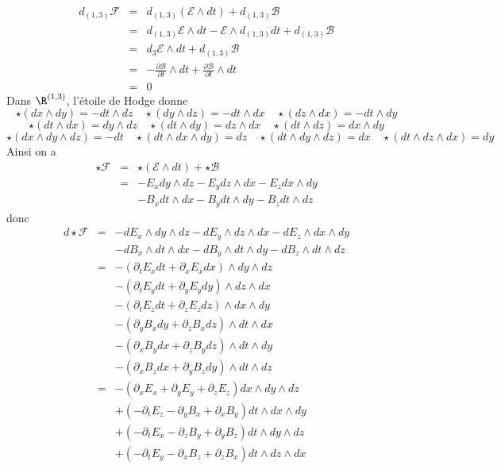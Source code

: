 \begin{eqnarray*}
d_{(1,3)}\mathscr{F} &=& d_{(1,3)}(\mathscr{E}\wedge dt) + d_{(1,3)}\mathscr{B} \\
&=& d_{(1,3)}\mathscr{E} \wedge dt - \mathscr{E} \wedge d_{(1,3)}dt + d_{(1,3)}\mathscr{B} \\
&=& d_3\mathscr{E} \wedge dt + d_{(1,3)}\mathscr{B} \\
&=& -\frac{\partial \mathscr{B}}{\partial t}\wedge dt + \frac{\partial \mathscr{B}}{\partial t}\wedge dt \\
&=& 0
\end{eqnarray*}
Dans $\R^{(1, 3)}$, l'étoile de Hodge donne 
$$\star(dx\wedge dy) = - dt\wedge dz \quad \star(dy\wedge dz) = - dt\wedge dx \quad \star(dz\wedge dx) = - dt\wedge dy$$
$$\star(dt\wedge dx) = dy\wedge dz \quad \star(dt\wedge dy) =  dz\wedge dx \quad \star(dt\wedge dz) = dx\wedge dy$$
$$\star(dx\wedge dy\wedge dz) = - dt \quad \star(dt\wedge dx\wedge dy) = dz \quad \star(dt\wedge dy\wedge dz) = dx \quad \star(dt\wedge dz\wedge dx) = dy$$
Ainsi on a 
\begin{eqnarray*}
\star \mathscr{F} &=& \star(\mathscr{E}\wedge dt) + \star \mathscr{B}  \\
&=& - E_x dy \wedge dz - E_y dz \wedge dx - E_z dx \wedge dy \\
& & -B_x dt \wedge dx - B_y dt \wedge dy - B_z dt \wedge dz
\end{eqnarray*}
donc
\begin{eqnarray*}
d\star \mathscr{F} &=& - d E_x \wedge dy \wedge dz - d E_y \wedge dz \wedge dx - d E_z \wedge dx \wedge dy \\
& & -d B_x\wedge dt \wedge dx - d B_y\wedge dt \wedge dy - d B_z\wedge dt \wedge dz \\
&=& -(\partial_t E_x dt + \partial_x E_x dx)\wedge dy \wedge dz \\
& & -(\partial_t E_y dt + \partial_y E_y dy)\wedge dz \wedge dx \\
& & -(\partial_t E_z dt + \partial_z E_z dz)\wedge dx \wedge dy \\
& & -(\partial_y B_x dy + \partial_z B_x dz)\wedge dt \wedge dx \\
& & -(\partial_x B_y dx + \partial_z B_y dz)\wedge dt \wedge dy \\
& & -(\partial_x B_z dx + \partial_y B_z dy)\wedge dt \wedge dz \\
&=& -(\partial_x E_x + \partial_y E_y + \partial_z E_z)dx \wedge dy \wedge dz \\
& & +(-\partial_t E_z - \partial_y B_x + \partial_x B_y) dt \wedge dx \wedge dy \\
& & +(-\partial_t E_x - \partial_z B_y + \partial_y B_z) dt \wedge dy \wedge dz \\
& & +(-\partial_t E_y - \partial_x B_z + \partial_z B_x) dt \wedge dz \wedge dx 
\end{eqnarray*}
